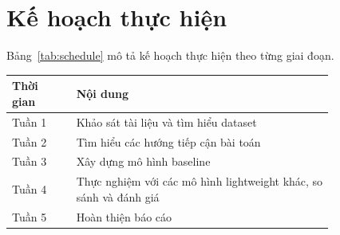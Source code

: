 \section{Kế hoạch thực hiện}
\label{planning}

Bảng~\ref{tab:schedule} mô tả kế hoạch thực hiện theo từng giai đoạn.

\begin{center}
\label{tab:schedule}
\renewcommand{\arraystretch}{1.5}
\begin{tabular}{@{}l p{0.8\linewidth}@{}}
\toprule
\textbf{Thời gian} & \textbf{Nội dung} \\
\midrule
Tuần 1 & Khảo sát tài liệu và tìm hiểu dataset \\
Tuần 2 & Tìm hiểu các hướng tiếp cận bài toán \\
Tuần 3 & Xây dựng mô hình baseline \\
Tuần 4 & Thực nghiệm với các mô hình lightweight khác, so sánh và đánh giá \\
Tuần 5 & Hoàn thiện báo cáo \\
\bottomrule
\end{tabular}
\end{center}
